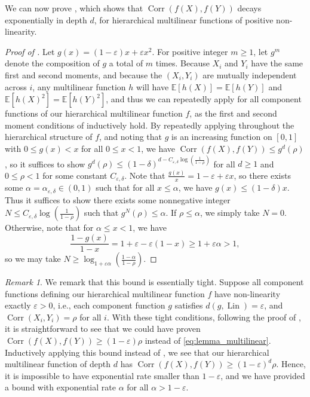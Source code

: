 \documentclass[12pt,letterpaper]{amsart}
\def\E{\mathbb{E}}
\def\Corr{\operatorname{Corr}}
\def\Lin{\operatorname{Lin}}
\newcommand{\paren}[1]{\left(#1\right)}
\newcommand{\1}[1]{1_{\left\{#1\right\}}}
\theoremstyle{definition}
\theoremstyle{remark}
\newtheorem{remark}[theorem]{Remark}
\begin{document}
We can now prove , which shows that $\Corr(f(X),f(Y))$ decays exponentially in depth $d$, for hierarchical multilinear functions of positive non-linearity.
\begin{proof}[Proof of ]
    Let $g(x)=(1-\varepsilon)x+\varepsilon x^2$.
    For positive integer $m\geq 1$, let $g^m$ denote the composition of $g$ a total of $m$ times.
    Because $X_i$ and $Y_i$ have the same first and second moments, and because the $(X_i,Y_i)$ are mutually independent across $i$, any multilinear function $h$ will have $\E[h(X)]=\E[h(Y)]$ and $\E[h(X)^2]=\E[h(Y)^2]$, and thus we can repeatedly apply  for all component functions of our hierarchical multilinear function $f$, as the first and second moment conditions of  inductively hold.
    By repeatedly applying  throughout the hierarchical structure of $f$, and noting that $g$ is an increasing function on $[0,1]$ with $0 \leq g(x)<x$ for all $0 \leq x < 1$, we have $\Corr(f(X),f(Y))\leq g^d(\rho)$, so it suffices to show $g^d(\rho)\leq \paren{1-\delta}^{d-C_{\varepsilon,\delta}\log\paren{\frac{1}{1-\rho}}}$ for all $d\geq 1$ and $0\leq\rho<1$ for some constant $C_{\varepsilon,\delta}$.
    Note that $\frac{g(x)}{x}=1-\varepsilon+\varepsilon x$, so there exists some $\alpha=\alpha_{\varepsilon,\delta}\in(0,1)$ such that for all $x\leq\alpha$, we have $g(x)\leq(1-\delta)x$.
    Thus it suffices to show there exists some nonnegative integer $N\leq C_{\varepsilon,\delta}\log\paren{\frac{1}{1-\rho}}$ such that $g^{N}(\rho)\leq\alpha$.
    If $\rho\leq\alpha$, we simply take $N=0$.
    Otherwise, note that for $\alpha\leq x<1$, we have
    \[ \frac{1-g(x)}{1-x} = 1+\varepsilon - \varepsilon(1-x) \geq 1+\varepsilon\alpha>1,\]
    so we may take $N\geq\log_{1+\varepsilon\alpha}\paren{\frac{1-\alpha}{1-\rho}}.$
\end{proof}
\begin{remark}\label{remark:multilinear_tightness}
    We remark that this bound is essentially tight.
    Suppose all component functions defining our hierarchical multilinear function $f$ have non-linearity exactly $\varepsilon>0$, i.e., each component function $g$ satisfies $d(g,\Lin)=\varepsilon$, and $\Corr(X_i,Y_i)=\rho$ for all $i$.
    With these tight conditions, following the proof of , it is straightforward to see that we could have proven $\Corr(f(X),f(Y))\geq(1-\varepsilon)\rho$ instead of \eqref{eq:lemma_multilinear}.
    Inductively applying this bound instead of , we see that our hierarchical multilinear function of depth $d$ has $\Corr(f(X),f(Y))\geq(1-\varepsilon)^d\rho$.
    Hence, it is impossible to have exponential rate smaller than $1-\varepsilon$, and we have provided a bound with exponential rate $\alpha$ for all $\alpha>1-\varepsilon$.
\end{remark}
\end{document}
